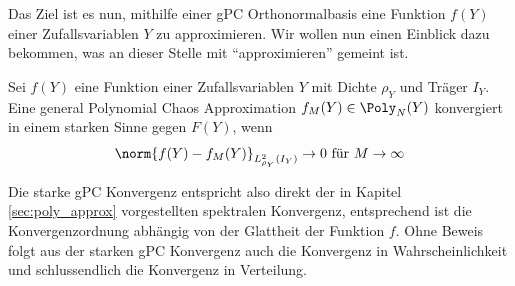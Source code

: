 Das Ziel ist es nun, mithilfe einer gPC Orthonormalbasis eine Funktion $f(Y)$ einer Zufallsvariablen $Y$ zu approximieren. Wir wollen nun einen Einblick dazu bekommen, was an dieser Stelle mit "`approximieren"' gemeint ist.
\begin{mathdef}
Sei $f(Y)$ eine Funktion einer Zufallsvariablen $Y$ mit Dichte $\rho_Y$ und Träger $I_Y$. Eine general Polynomial Chaos Approximation $f_M(Y)\in\Poly_N(Y)$ konvergiert in einem starken Sinne gegen $F(Y)$, wenn \[\norm{f(Y)-f_M(Y)}_{L_{\rho_Y}^2(I_Y)}\to 0\text{ für }{M\to\infty}\]
\end{mathdef}
Die starke gPC Konvergenz entspricht also direkt der in Kapitel \ref{sec:poly_approx} vorgestellten spektralen Konvergenz, entsprechend ist die Konvergenzordnung abhängig von der Glattheit der Funktion $f$. Ohne Beweis folgt aus der starken gPC Konvergenz auch die Konvergenz in Wahrscheinlichkeit und schlussendlich die Konvergenz in Verteilung.
